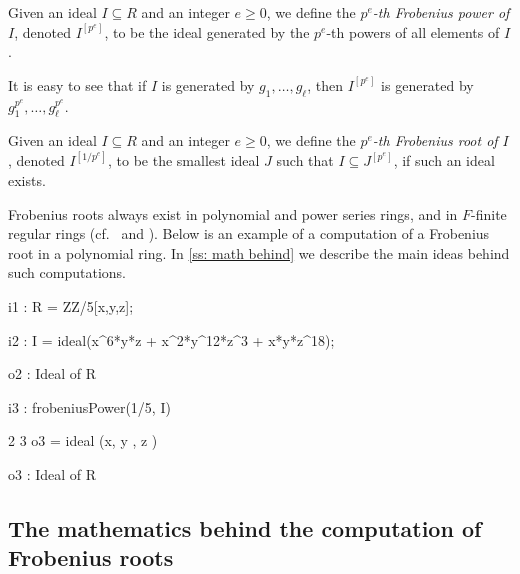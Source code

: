 \documentclass{amsart}
\renewcommand{\geq}{\geqslant}
\begin{document}
\begin{definition}
Given an ideal $I\subseteq R$ and an integer $e\geq 0$, we define the \emph{$p^e$-th Frobenius power of $I$}, denoted $I^{[p^e]}$, to be the ideal
generated by the $p^e$-th powers of all elements of $I$.
\end{definition}

It is easy to see that if $I$ is generated by $g_1, \dots, g_\ell$, then $I^{[p^e]}$ is generated by $g_1^{p^e}, \dots, g_\ell^{p^e}$.


\begin{definition}
Given an ideal $I\subseteq R$ and an integer $e\geq 0$, we define the \emph{$p^e$-th Frobenius root of $I$}, denoted $I^{[1/p^{e}]}$, to be the smallest ideal $J$ such that $I\subseteq J^{[p^e]}$, if such an ideal exists.
\end{definition}

Frobenius roots always exist in polynomial and power series rings, and in $F$-finite regular rings
(cf.~\cite[\S 2]{BlickleMustataSmithDiscretenessAndRationalityOfFThresholds} and \cite[\S 5]{KatzmanParameterTestIdealOfCMRings}).
Below is an example of a computation of a Frobenius root in a polynomial ring.
In \autoref{ss: math behind} we describe the main ideas behind such computations.

\medskip
{\small
{}
\begin{MyVerbatim}
i1 : R = ZZ/5[x,y,z];

i2 : I = ideal(x^6*y*z + x^2*y^12*z^3 + x*y*z^18);

o2 : Ideal of R

i3 : frobeniusPower(1/5, I)

                2   3
o3 = ideal (x, y , z )

o3 : Ideal of R
\end{MyVerbatim}
}
\medskip

\subsection{The mathematics behind the computation of Frobenius roots}
\label{ss: math behind}
\end{document}
